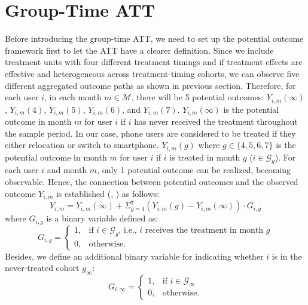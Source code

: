 \section{Group-Time ATT}
Before introducing the group-time ATT, we need to set up the potential outcome framework first to let the ATT have a clearer definition.
Since we include treatment units with four different treatment timings and if treatment effects are effective and heterogeneous across treatment-timing cohorts, we can observe five different aggregated outcome paths as shown in previous section. Therefore, for each user $i$, in each month $m \in \mathcal{M}$, there will be 5 potential outcomes: $Y_{i, m}(\infty)$, $Y_{i, m}(4)$, $Y_{i, m}(5)$, $Y_{i, m}(6)$, and $Y_{i, m}(7)$. $Y_{i, m}(\infty)$ is the potential outcome in month $m$ for user $i$ if $i$ has never received the treatment throughout the sample period. In our case, phone users are considered to be treated if they either relocation or switch to smartphone. $Y_{i, m}(g)$ where $g \in \{4,5,6,7\}$ is the potential outcome in month $m$ for user $i$ if $i$ is treated in month $g$ ($i \in \mathcal{G}_g$). For each user $i$ and month $m$, only 1 potential outcome can be realized, becoming observable. Hence, the connection between potential outcomes and the observed outcome $Y_{i, m}$ is established (\cite{callaway2021difference}, \cite{sun2021estimating}) as follows:
\begin{equation}\label{eq:observed_outcome}
Y_{i, m}
= Y_{i, m}(\infty)
    + \Sigma_{g=4}^7 ( Y_{i, m}(g) - Y_{i, m}(\infty) ) \cdot G_{i, g}
\end{equation}
where $G_{i, g}$ is a binary variable defined as:
$$
G_{i, g} =
\begin{cases}
    1,
    & \text{if } i \in \mathcal{G}_g \text{, i.e., $i$ receives the treatment in month $g$} \\
    0,
    & \text{otherwise}.
\end{cases}
$$
Besides, we define an additional binary variable for indicating whether $i$ is in the never-treated cohort $g_\infty$:
$$
G_{i, \infty} =
\begin{cases}
    1,
    & \text{if } i \in \mathcal{G}_{\infty} \\
    0,
    & \text{otherwise}.
\end{cases}
$$

